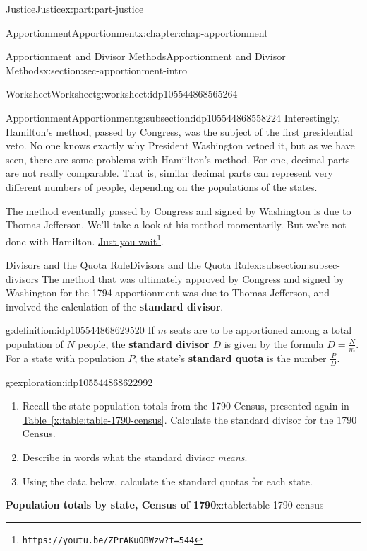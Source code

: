 \documentclass[oneside,10pt,]{book}
\newcommand{\xreffont}{\relax}
\newcommand{\terminology}[1]{\textbf{#1}}
\numberwithin{equation}{section}
\begin{document}
\begin{partptx}{Justice}{}{Justice}{}{}{x:part:part-justice}
\begin{chapterptx}{Apportionment}{}{Apportionment}{}{}{x:chapter:chap-apportionment}
\begin{sectionptx}{Apportionment and Divisor Methods}{}{Apportionment and Divisor Methods}{}{}{x:section:sec-apportionment-intro}
\begin{worksheet-subsection}{Worksheet}{}{Worksheet}{}{}{g:worksheet:idp105544868565264}
\begin{subsectionptx}{Apportionment}{}{Apportionment}{}{}{g:subsection:idp105544868558224}
Interestingly, Hamilton's method, passed by Congress, was the subject of the first presidential veto. No one knows exactly why President Washington vetoed it, but as we have seen, there are some problems with Hamiilton's method. For one, decimal parts are not really comparable. That is, similar decimal parts can represent very different numbers of people, depending on the populations of the states.%
\par
The method eventually passed by Congress and signed by Washington is due to Thomas Jefferson. We'll take a look at his method momentarily. But we're not done with Hamilton. \href{https://youtu.be/ZPrAKuOBWzw?t=544}{Just you wait}\footnote{\nolinkurl{https://youtu.be/ZPrAKuOBWzw?t=544}\label{g:fn:idp105544868632720}}.%
\end{subsectionptx}
%
%
\typeout{************************************************}
\typeout{************************************************}
%
\begin{subsectionptx}{Divisors and the Quota Rule}{}{Divisors and the Quota Rule}{}{}{x:subsection:subsec-divisors}
The method that was ultimately approved by Congress and signed by Washington for the 1794 apportionment was due to Thomas Jefferson, and involved the calculation of the \terminology{standard divisor}.%
\begin{definition}{}{g:definition:idp105544868629520}%
If \(m\) seats are to be apportioned among a total population of \(N\) people, the \terminology{standard divisor} \(D\) is given by the formula \(D = \frac{N}{m}\). For a state with population \(P\), the state's \terminology{standard quota} is the number \(\frac{P}{D}\).%
\end{definition}
\begin{exploration}{}{g:exploration:idp105544868622992}%
%
\begin{enumerate}[label=(\alph*)]
\item{}Recall the state population totals from the 1790 Census, presented again in \hyperref[x:table:table-1790-census]{Table~{\xreffont\ref{x:table:table-1790-census}}}. Calculate the standard divisor for the 1790 Census.%
\item{}Describe in words what the standard divisor \emph{means}.%
\item{}Using the data below, calculate the standard quotas for each state.%
\end{enumerate}
\begin{tableptx}{\textbf{Population totals by state, Census of 1790}}{x:table:table-1790-census}{}%

\end{tableptx}
\end{exploration}
\end{subsectionptx}
\end{worksheet-subsection}
\end{sectionptx}
\end{chapterptx}
\end{partptx}
\end{document}
